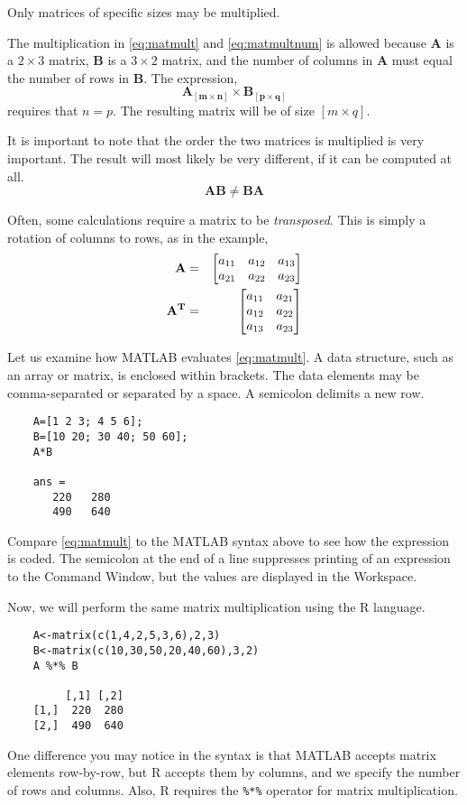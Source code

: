 Only matrices of specific sizes may be multiplied.

The multiplication in \eqref{eq:matmult} and \eqref{eq:matmultnum} is allowed because $\mathbf{A}$ is a $2 \times 3$ matrix, $\mathbf{B}$ is a $3 \times 2$ matrix, and the number of columns in $\mathbf{A}$ must equal the number of rows in $\mathbf{B}$. The expression,
\[
\mathbf{A_{[m \times n]}} \times \mathbf{B_{[p \times q]}}
\]
requires that $n=p$. The resulting matrix will be of size $[m \times q]$.

It is important to note that the order the two matrices is multiplied is very important. The result will most likely be very different, if it can be computed at all.
\[
\boxed{\quad \mathbf{AB} \neq \mathbf{BA} \quad}
\]

Often, some calculations require a matrix to be \emph{transposed}. This is simply a rotation of columns to rows, as in the example,
\begin{eqnarray}
\mathbf{A} &=& \notag
	\begin{bmatrix}
	a_{11} & a_{12} & a_{13} \\
	a_{21} & a_{22} & a_{23} \\
	\end{bmatrix} \\
\mathbf{A^{T}} &=& \notag
	\begin{bmatrix}
	a_{11} & a_{21} \\
	a_{12} & a_{22} \\
	a_{13} & a_{23} \\
	\end{bmatrix}
\end{eqnarray}

Let us examine how MATLAB evaluates \eqref{eq:matmult}. A data structure, such as an array or matrix, is enclosed within brackets. The data elements may be comma-separated or separated by a space. A semicolon delimits a new row.
\begin{verbatim}
    A=[1 2 3; 4 5 6];
    B=[10 20; 30 40; 50 60];
    A*B

    ans =
       220   280
       490   640
\end{verbatim}
Compare \eqref{eq:matmult} to the MATLAB syntax above to see how the expression is coded. The semicolon at the end of a line suppresses printing of an expression to the Command Window, but the values are displayed in the Workspace.

Now, we will perform the same matrix multiplication using the R language.
\begin{verbatim}
    A<-matrix(c(1,4,2,5,3,6),2,3)
    B<-matrix(c(10,30,50,20,40,60),3,2)
    A %*% B
    
         [,1] [,2]
    [1,]  220  280
    [2,]  490  640
\end{verbatim}
One difference you may notice in the syntax is that MATLAB accepts matrix elements row-by-row, but R accepts them by columns, and we specify the number of rows and columns. Also, R requires the \texttt{\%*\%} operator for matrix multiplication. 

